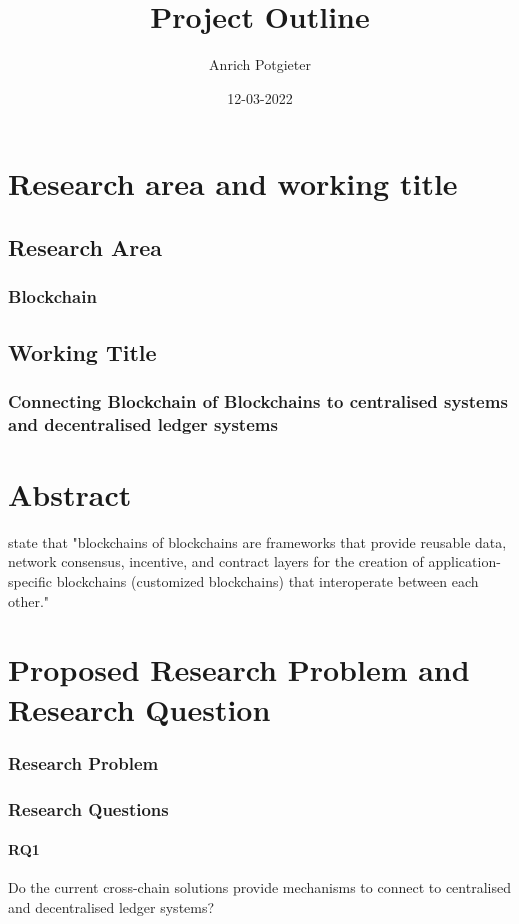 \documentclass[12pt]{article}
\title{Project Outline}
\author{Anrich Potgieter}
\date{12-03-2022}
\begin{document}
\maketitle
\tableofcontents

\section{Research area and working title}
\subsection{Research Area}
\subsubsection{Blockchain}

\subsection{Working Title}
\subsubsection{Connecting Blockchain of Blockchains to centralised systems and decentralised ledger systems}

\section{Abstract}

\autocite{belchiorSurveyBlockchainInteroperability2021}
state that "blockchains of blockchains are frameworks that provide reusable data, network consensus, incentive, and contract layers for the creation of application-specific blockchains (customized blockchains) that interoperate between each other."

\section{Proposed Research Problem and Research Question}
\subsubsection{Research Problem}

\subsubsection{Research Questions}
\paragraph{RQ1} Do the current cross-chain solutions provide mechanisms to connect to centralised and decentralised ledger systems?
\end{document}
